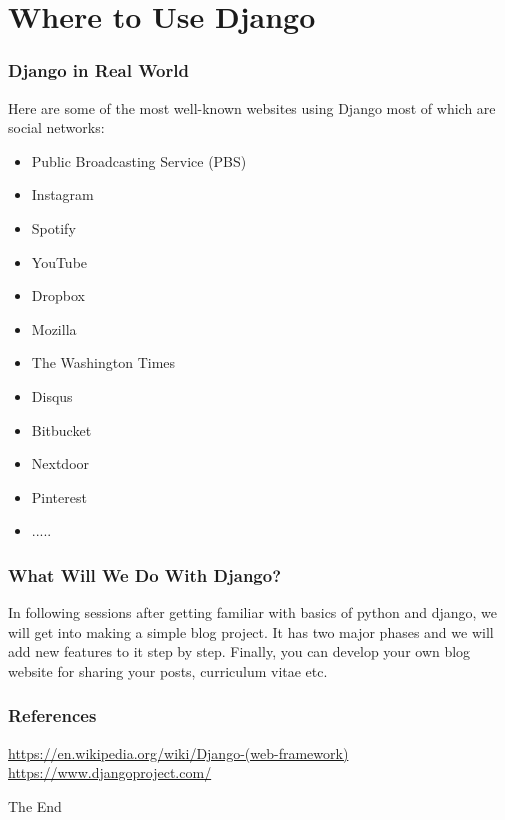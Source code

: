 \documentclass{beamer}
\begin{document}
\section{Where to Use Django}
\begin{frame}
	\frametitle{Django in Real World}
	Here are some of the most well-known websites using Django most of which are social networks:
	
	\begin{itemize}
		\item Public Broadcasting Service (PBS)
		\item Instagram
		\item Spotify
		\item YouTube
		\item Dropbox
		\item Mozilla
		\item The Washington Times
		\item Disqus
		\item Bitbucket
		\item Nextdoor
		\item Pinterest
		\item .....
	\end{itemize}
\end{frame}

\begin{frame}
	\frametitle{What Will We Do With Django?}
	In following sessions after getting familiar with basics of python and django, we will get into making a simple blog project. It has two major phases and we will add new features to it step by step.
	Finally, you can develop your own blog website for sharing your posts, curriculum vitae etc.
\end{frame}

\begin{frame}
\frametitle{References}
	\href{https://en.wikipedia.org/wiki/Django_(web_framework)}{https://en.wikipedia.org/wiki/Django-(web-framework)}
	\href{https://www.djangoproject.com/}{https://www.djangoproject.com/}
\end{frame}

\begin{frame}
\Huge{\centerline{The End}}
\end{frame}
\end{document}
